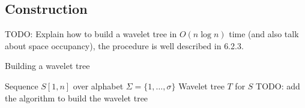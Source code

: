 \subsection{Construction}
TODO: Explain how to build a wavelet tree in $O(n \log n)$ time (and also talk about space occupancy), the procedure is well described in \cite{navarro2016compact} 6.2.3.

\begin{algorithm}
    \caption{Building a wavelet tree}\label{alg:build_wt}
    \begin{algorithmic}
        \Require Sequence $S[1,n]$ over alphabet $\Sigma = \{1,\dots,\sigma\}$
        \Ensure Wavelet tree $T$ for $S$
        \State TODO: add the algorithm to build the wavelet tree
    \end{algorithmic}
\end{algorithm}
